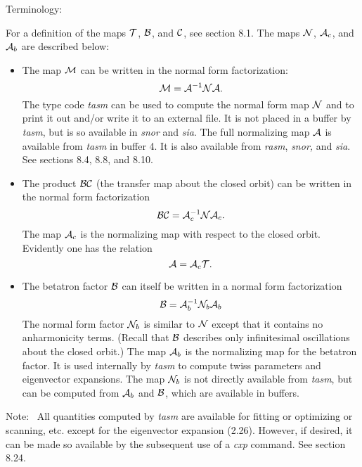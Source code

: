 \vspace{5mm}
Terminology:
\vspace{2mm}

     For a definition of the maps ${\cal T}$, ${\cal B}$, and ${\cal C}$, see section 8.1.  The maps
${\cal N}$, ${\cal A}_c$, and ${\cal A}_b$  are described below:
\begin{itemize}
\item The map ${\cal M}$ can be written in the normal form factorization:
\[   {\cal M}={\cal A}^{-1} {\cal N A}   .\]
The type code {\em tasm } can be used to compute the normal form map ${\cal N}$ and
      to print it out and/or write it to an external file.  It is not
      placed in a buffer by {\em tasm}, but is so available in{ \em snor } and {\em sia}.
      The full normalizing map ${\cal A}$ is available from {\em
	  tasm} in buffer 4.  It is also available
      from {\em rasm}, {\em snor,} and {\em sia}.  See sections 8.4, 8.8, and 8.10.

\item  The product ${\cal BC}$ (the transfer map about the closed orbit) can be
      written in the normal form factorization
\[  {\cal BC} = {\cal A}_c^{-1} {\cal NA}_c   .\]
The map ${\cal A}_c$  is the normalizing map with respect to the closed orbit.
      Evidently one has the relation
\[  {\cal A}={\cal A}_c {\cal T}  .\]

\item  The betatron factor ${\cal B}$ can itself be written in a normal form factorization
\[  {\cal B}={\cal A}_b^{-1} {\cal N}_b {\cal A}_b  \]
The normal form factor ${\cal N}_b$  is similar to ${\cal N}$ except that it contains no
      anharmonicity terms.  (Recall that ${\cal B}$ describes only infinitesimal
      oscillations about the closed orbit.)  The map ${\cal A}_b$  is the normalizing
      map for the betatron factor.  It is used internally by {\em tasm } to compute twiss
      parameters and eigenvector expansions.  The map ${\cal N}_b$ is not
      directly available from {\em tasm}, but can be computed from ${\cal A}_b$  and
      ${\cal B}$, which are available in buffers.
\end{itemize}

Note: \ All quantities computed by {\em tasm} are available for fitting or optimizing or scanning, etc. except for the eigenvector expansion (2.26).  However, if desired, it can be made so available by the subsequent use of a {\em cxp} command.  See section 8.24.

